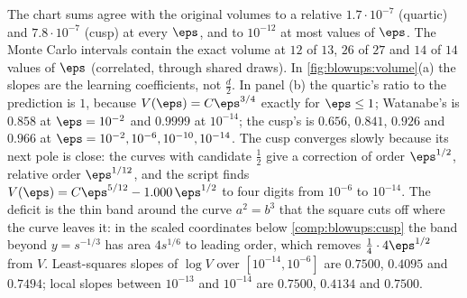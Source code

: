 \begin{refsection}
The chart sums agree with the original volumes to a relative $1.7\cdot10^{-7}$ (quartic) and $7.8\cdot10^{-7}$ (cusp) at every $\eps$, and to $10^{-12}$ at most values of $\eps$. The Monte Carlo intervals contain the exact volume at $12$ of $13$, $26$ of $27$ and $14$ of $14$ values of $\eps$ (correlated, through shared draws). In \cref{fig:blowups:volume}(a) the slopes are the learning coefficients, not $\frac d2$. In panel (b) the quartic's ratio to the prediction is $1$, because $V(\eps)=C\eps^{3/4}$ exactly for $\eps\le1$; Watanabe's is $0.858$ at $\eps=10^{-2}$ and $0.9999$ at $10^{-14}$; the cusp's is $0.656$, $0.841$, $0.926$ and $0.966$ at $\eps=10^{-2},10^{-6},10^{-10},10^{-14}$. The cusp converges slowly because its next pole is close: the curves with candidate $\frac12$ give a correction of order $\eps^{1/2}$, relative order $\eps^{1/12}$, and the script finds $V(\eps)=C\eps^{5/12}-1.000\,\eps^{1/2}$ to four digits from $10^{-6}$ to $10^{-14}$. The deficit is the thin band around the curve $a^2=b^3$ that the square cuts off where the curve leaves it: in the scaled coordinates below \cref{comp:blowups:cusp} the band beyond $y=s^{-1/3}$ has area $4s^{1/6}$ to leading order, which removes $\frac14\cdot4\eps^{1/2}$ from $V$. Least-squares slopes of $\log V$ over $[10^{-14},10^{-6}]$ are $0.7500$, $0.4095$ and $0.7494$; local slopes between $10^{-13}$ and $10^{-14}$ are $0.7500$, $0.4134$ and $0.7500$.


\end{refsection}
